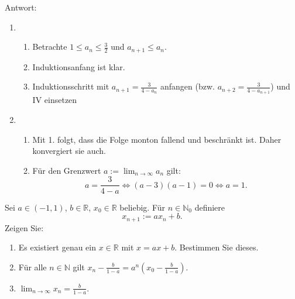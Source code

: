 Antwort:
\begin{enumerate}
    \item
    \begin{enumerate}
        \item Betrachte $1 \leq a_n \leq \frac{3}{2}$ und $a_{n+1} \leq a_n$.
        \item Induktionsanfang ist klar.
        \item Induktionsschritt mit $a_{n+1} = \frac{3}{4 - a_n}$ anfangen (bzw. $a_{n+2} = \frac{3}{4 - a_{n+1}}$) und IV einsetzen
    \end{enumerate}
    \item
    \begin{enumerate}
        \item Mit 1. folgt, dass die Folge monton fallend und beschränkt ist.
        Daher konvergiert sie auch.
        \item Für den Grenzwert $a := \lim_{n \to \infty} a_n$ gilt:
        \begin{displaymath}
          a = \frac{3}{4 - a}
          \iff (a-3)(a-1) = 0
          \iff a = 1.
        \end{displaymath}
    \end{enumerate}
\end{enumerate}

Sei $a \in (-1,1)$, $b \in \mathbb{R}$, $x_0 \in \mathbb{R}$ beliebig. Für $n \in \mathbb{N}_0$ definiere
\begin{displaymath}
  x_{n+1} := ax_n + b.
\end{displaymath}
Zeigen Sie:
\begin{enumerate}
    \item Es existiert genau ein $x \in \mathbb{R}$ mit $x = ax+b$. Bestimmen Sie dieses.
    \item Für alle $n \in \mathbb{N}$ gilt $x_n - \frac{b}{1-a} = a^n\left(x_0 - \frac{b}{1-a}\right)$.
    \item $\lim_{n \to \infty} x_n = \frac{b}{1-a}$.
\end{enumerate}

